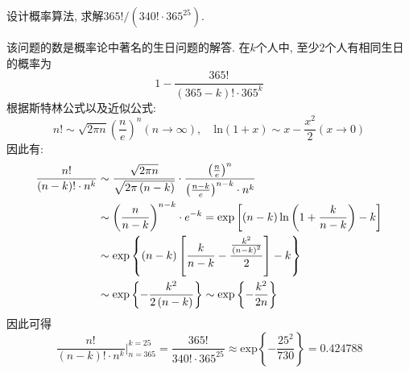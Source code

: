 \documentclass{article}
\begin{document}
\begin{homeworkProblem}
	设计概率算法, 求解$365!/\left(340!\cdot 365^{25}\right)$.

	\solution 该问题的数是概率论中著名的生日问题的解答. 在$k$个人中, 至少2个人有相同生日的概率为$$1-\frac{365!}{\left( 365-k \right) !\cdot 365^k}
	$$
	根据斯特林公式以及近似公式:
	$$
	n!\sim \sqrt{2\pi n}\left( \frac{n}{e} \right) ^n(n\to \infty),\quad \text{ln} \left( 1+x \right) \sim x-\frac{x^2}{2}(x\to 0)
	$$
	因此有:
	\begin{align}
		\frac{n!}{\left( n-k \right) !\cdot n^k}&\sim \frac{\sqrt{2\pi n}}{\sqrt{2\pi \left( n-k \right)}}\cdot \frac{\left( \frac{n}{e} \right) ^n}{\left( \frac{n-k}{e} \right) ^{n-k}\cdot n^k} \notag
		\\
		&\sim \left( \frac{n}{n-k} \right) ^{n-k}\cdot e^{-k}=\text{exp} \left[ \left( n-k \right) \ln \left( 1+\frac{k}{n-k} \right) -k \right] \notag
		\\
		&\sim \text{exp} \left\{ \left( n-k \right) \left[ \frac{k}{n-k}-\frac{\frac{k^2}{\left( n-k \right) ^2}}{2} \right] -k \right\} \notag
		\\
		&\sim \text{exp} \left\{ -\frac{k^2}{2\left( n-k \right)} \right\} \sim \text{exp} \left\{ -\frac{k^2}{2n} \right\} \notag
	\end{align}
	因此可得
	$$
	\frac{n!}{\left( n-k \right) !\cdot n^k}\bigg|_{n=365}^{k=25}=\frac{365!}{340!\cdot 365^{25}}\approx \text{exp} \left\{ -\frac{25^2}{730} \right\} =0.424788
	$$
\end{homeworkProblem}
\end{document}
